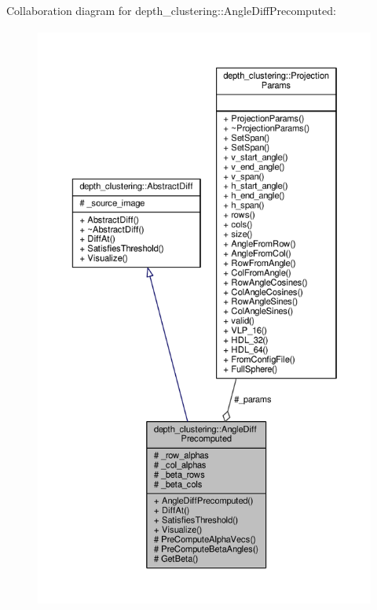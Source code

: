 Collaboration diagram for depth\-\_\-clustering\-:\-:Angle\-Diff\-Precomputed\-:
\nopagebreak
\begin{figure}[H]
\begin{center}
\leavevmode
\includegraphics[height=550pt]{classdepth__clustering_1_1AngleDiffPrecomputed__coll__graph}
\end{center}
\end{figure}


